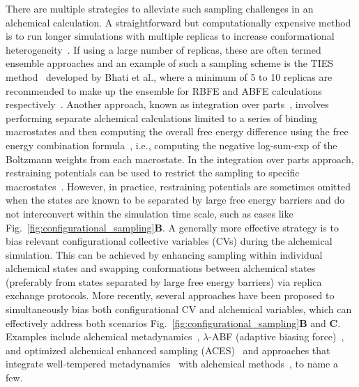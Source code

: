 \documentclass[9pt,bestpractices]{livecoms}
\begin{document}
There are multiple strategies to alleviate such sampling challenges in an alchemical calculation. A straightforward but computationally expensive method is to run longer simulations with multiple replicas to increase conformational heterogeneity~\cite{suruzhon2021sensitivity}.
If using a large number of replicas, these are often termed ensemble approaches and an example of such a sampling scheme is the TIES method~\cite{bhati2017} developed by Bhati et al., where a minimum of 5 to 10 replicas are recommended to make up the ensemble for RBFE and ABFE calculations respectively~\cite{bhati2022, bhati2025}.
Another approach, known as integration over parts~\cite{jayachandran2006parallelized}, involves performing separate alchemical calculations limited to a series of binding macrostates and  then computing the overall free energy difference using the free energy combination formula~\cite{gallicchio2011recent,hsu2023alchemical}, i.e., computing the negative log-sum-exp of the Boltzmann weights from each macrostate. In the integration over parts approach, restraining potentials can be used to restrict the sampling to specific macrostates~\cite{khuttan2023taming}. However, in practice, restraining potentials are sometimes omitted when the states are known to be separated by large free energy barriers and do not interconvert within the simulation time scale, such as cases like Fig.~\ref{fig:configurational_sampling}\textbf{B}.
A generally more effective strategy is to bias relevant configurational collective variables (CVs) during the alchemical simulation. This can be achieved by enhancing sampling within individual alchemical states and swapping conformations between alchemical states (preferably from states separated by large free energy barriers) via replica exchange protocols. More recently, several approaches have been proposed to simultaneously bias both configurational CV and alchemical variables, which can effectively address both scenarios Fig.~\ref{fig:configurational_sampling}\textbf{B} and \textbf{C}. Examples include alchemical metadynamics~\cite{hsu2023alchemical}, $\lambda$-ABF (adaptive biasing force)~\cite{lagardere2024lambda}, and optimized alchemical enhanced sampling (ACES)~\cite{lee2023aces}  and approaches that integrate well-tempered metadynamics~\cite{barducci2008well} with alchemical methods~\cite{zhou2025zooming, khuttan2024make}, to name a few.
\end{document}
